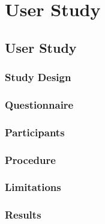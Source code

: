 \chapter{User Study}
\label{ch:study}
\section{User Study}

\subsection{Study Design}
\subsection{Questionnaire}
\subsection{Participants}
\subsection{Procedure}
\subsection{Limitations}
\subsection{Results}


